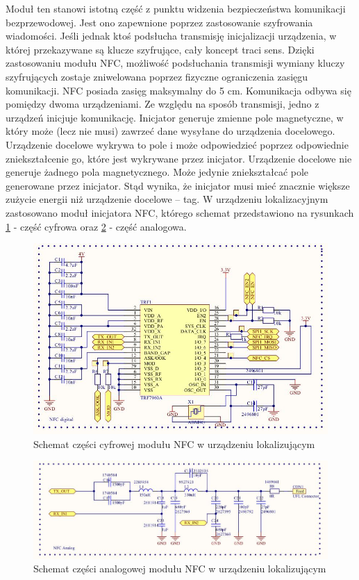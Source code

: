 Moduł ten stanowi istotną część z punktu widzenia bezpieczeństwa komunikacji bezprzewodowej. Jest ono zapewnione poprzez zastosowanie szyfrowania wiadomości. Jeśli jednak ktoś podsłucha transmisję inicjalizacji urządzenia, w której przekazywane są klucze szyfrujące, cały koncept traci sens. Dzięki zastosowaniu modułu NFC, możliwość podsłuchania transmisji wymiany kluczy szyfrujących zostaje zniwelowana poprzez fizyczne ograniczenia zasięgu komunikacji. NFC posiada zasięg maksymalny do 5 cm.
Komunikacja odbywa się pomiędzy dwoma urządzeniami. Ze względu na sposób transmisji, jedno z urządzeń inicjuje komunikację. Inicjator generuje zmienne pole magnetyczne, w który może (lecz nie musi) zawrzeć dane wysyłane do urządzenia docelowego. Urządzenie docelowe wykrywa to pole i może odpowiedzieć poprzez odpowiednie zniekształcenie go, które jest wykrywane przez inicjator. Urządzenie docelowe nie generuje żadnego pola magnetycznego. Może jedynie zniekształcać pole generowane przez inicjator. Stąd wynika, że inicjator musi mieć znacznie większe zużycie energii niż urządzenie docelowe – tag. W urządzeniu lokalizacyjnym zastosowano moduł inicjatora NFC, którego schemat przedstawiono na rysunkach \ref{fig:image_mainboard_NFC_digital} - część cyfrowa oraz \ref{fig:image_mainboard_NFC_analog} - część analogowa.

\begin{figure}[H]
	\centering
	\includegraphics[width=15cm]{img/schematics/mainboard_NFC_chip.jpg}
	\caption{Schemat części cyfrowej modułu NFC w urządzeniu lokalizującym}
	\label{fig:image_mainboard_NFC_digital}
\end{figure}

\begin{figure}[H]
	\centering
	\includegraphics[width=15cm]{img/schematics/mainboard_NFC_analog.jpg}
	\caption{Schemat części analogowej modułu NFC w urządzeniu lokalizującym}
	\label{fig:image_mainboard_NFC_analog}
\end{figure}


